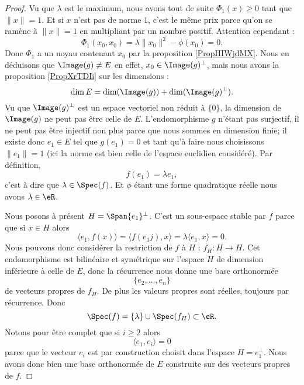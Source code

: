 \begin{proof}
    Vu que \( \lambda\) est le maximum, nous avons tout de suite \( \Phi_1(x)\geq 0\) tant que \( \| x \|=1\). Et si \( x\) n'est pas de norme \( 1\), c'est le même prix parce qu'on se ramène à \( \| x \|=1\) en multipliant par un nombre positif. Attention cependant : 
    \begin{equation}
        \Phi_1(x_0,x_0)=\lambda\| x_0 \|^2-\phi(x_0)=0.
    \end{equation}
    Donc \( \Phi_1\) a un noyau contenant \( x_0\) par la proposition \ref{PropHIWjdMX}. Nous en déduisons que \( \Image(g)\neq E\) en effet, \( x_0\in\Image(g)^{\perp}\), mais nous avons la proposition \ref{PropXrTDIi} sur les dimensions : 
    \begin{equation}
        \dim E=\dim(\Image(g))+\dim( \Image(g)^{\perp}).
    \end{equation}
    Vu que \( \Image(g)^{\perp}\) est un espace vectoriel non réduit à \( \{ 0 \}\), la dimension de \( \Image(g)\) ne peut pas être celle de \( E\). L'endomorphisme \( g\) n'étant pas surjectif, il ne peut pas être injectif non plus parce que nous sommes en dimension finie; il existe donc \( e_1\in E\) tel que \( g(e_1)=0\) et tant qu'à faire nous choisissons \( \| e_1 \|=1\) (ici la norme est bien celle de l'espace euclidien considéré). Par définition,
    \begin{equation}
        f(e_1)=\lambda e_1,
    \end{equation}
    c'est à dire que \( \lambda\in\Spec(f)\). Et \( \phi\) étant une forme quadratique réelle nous avons \( \lambda\in \eR\).

    Nous posons à présent \( H=\Span\{ e_1 \}^{\perp}\). C'est un sous-espace stable par \( f\) parce que si \( x\in H\) alors
    \begin{equation}
        \langle e_1, f(x)\rangle =\langle f(e_1j),x\rangle =\lambda\langle e_1, x\rangle =0.
    \end{equation}
    Nous pouvons donc considérer la restriction de \( f\) à \( H\) : \( f_H\colon H\to H\). Cet endomorphisme est bilinéaire et symétrique sur l'espace \( H\) de dimension inférieure à celle de \( E\), donc la récurrence nous donne une base orthonormée
    \begin{equation}
        \{ e_2,\ldots, e_n \}
    \end{equation}
    de vecteurs propres de \( f_H\). De plus les valeurs propres sont réelles, toujours par récurrence. Donc
    \begin{equation}
        \Spec(f)=\{ \lambda \}\cup\Spec(f_H)\subset \eR.
    \end{equation}
    Notons pour être complet que si \( i\geq 2\) alors
    \begin{equation}
        \langle e_1, e_i\rangle =0
    \end{equation}
    parce que le vecteur \( e_i\) est par construction choisit dans l'espace \( H=e_1^{\perp}\). Nous avons donc bien une base orthonormée de \( E\) construite sur des vecteurs propres de \( f\).
\end{proof}

